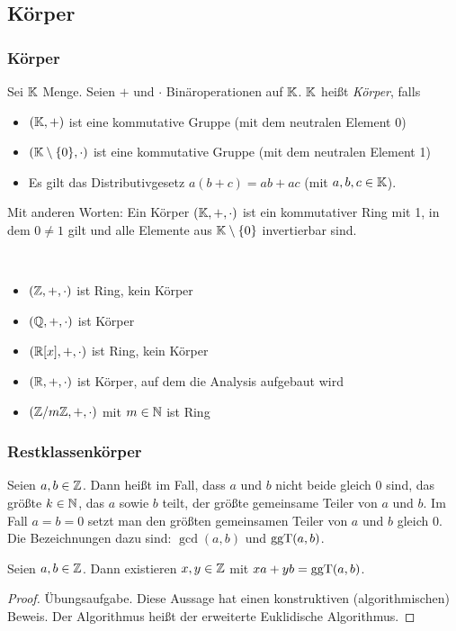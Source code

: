 \clearpage
\subsection{Körper}

\subsubsection{Körper}

Sei $ \mathbb K $ Menge. Seien $ + $ und $ \cdot $ Binäroperationen auf $ \mathbb K $. $ \mathbb K $ heißt \emph{Körper}, falls
\begin{itemize}
	\item
		$ (\mathbb K, +) $ ist eine kommutative Gruppe (mit dem neutralen Element 0)
	\item
		$ (\mathbb K \setminus \{0\}, \cdot) $ ist eine kommutative Gruppe (mit dem neutralen Element 1)
	\item
		Es gilt das Distributivgesetz $ a(b+c) = ab+ac$ (mit $a,b,c \in \mathbb K$).
\end{itemize}
Mit anderen Worten: Ein Körper $ (\mathbb K, +, \cdot) $ ist ein kommutativer Ring mit 1, in dem $ 0 \neq 1 $ gilt und alle Elemente aus $ \mathbb K \setminus \{0\} $ invertierbar sind.

\begin{bsp}\
	\begin{itemize}
		\item $ (\mathbb Z, +, \cdot) $ ist Ring, kein Körper
		\item $ (\mathbb Q, +, \cdot) $ ist Körper
		\item $ (\mathbb R[x], +, \cdot) $ ist Ring, kein Körper
		\item $ (\mathbb R, +, \cdot) $ ist Körper, auf dem die Analysis aufgebaut wird
		\item $ (\mathbb Z/m\mathbb Z, +, \cdot) $ mit $ m \in \mathbb N $ ist Ring
	\end{itemize}
\end{bsp}

\subsubsection{Restklassenkörper}

Seien $ a,b \in \mathbb Z $. Dann heißt im Fall, dass $a$ und $b$ nicht beide gleich $0$ sind, das größte $k \in \mathbb N$, das $a$ sowie $b$ teilt, der größte gemeinsame Teiler von $a$ und $b$. Im Fall $a=b=0$ setzt man den größten gemeinsamen Teiler von $a$ und $b$ gleich $0$. Die Bezeichnungen dazu sind: $\gcd(a,b)$ und $\operatorname{ggT}(a,b)$. 

\begin{propn}
	Seien $ a,b \in \mathbb Z $. Dann existieren $ x,y \in \mathbb Z $ mit $ xa+yb = \operatorname{ggT}(a,b) $.
\end{propn}
\begin{proof}
	Übungsaufgabe. Diese Aussage hat einen konstruktiven (algorithmischen) Beweis. Der Algorithmus heißt der erweiterte Euklidische Algorithmus. 
\end{proof}

